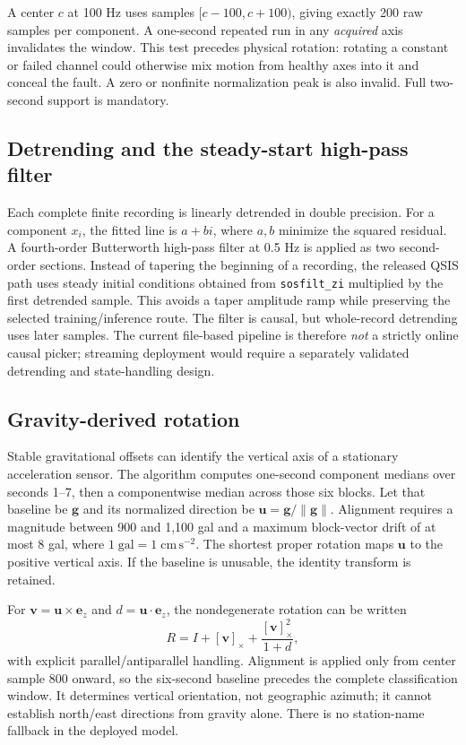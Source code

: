 \documentclass[a4paper,11pt,oneside]{article}
\newcommand{\code}[1]{\nolinkurl{#1}}
\begin{document}
A center $c$ at 100 Hz uses samples $[c-100,c+100)$, giving exactly 200 raw
samples per component. A one-second repeated run in any \emph{acquired} axis
invalidates the window. This test precedes physical rotation: rotating a
constant or failed channel could otherwise mix motion from healthy axes into
it and conceal the fault. A zero or nonfinite normalization peak is also
invalid. Full two-second support is mandatory.

\subsection{Detrending and the steady-start high-pass filter}
Each complete finite recording is linearly detrended in double precision.
For a component $x_i$, the fitted line is $a+bi$, where $a,b$ minimize the
squared residual. A fourth-order Butterworth high-pass filter at 0.5 Hz is
applied as two second-order sections. Instead of tapering the beginning of a
recording, the released QSIS path uses steady initial conditions obtained
from \code{sosfilt_zi} multiplied by the first detrended sample. This avoids a
taper amplitude ramp while preserving the selected training/inference route.
The filter is causal, but whole-record detrending uses later samples. The
current file-based pipeline is therefore \emph{not} a strictly online causal
picker; streaming deployment would require a separately validated detrending
and state-handling design.

\subsection{Gravity-derived rotation}
Stable gravitational offsets can identify the vertical axis of a stationary
acceleration sensor. The algorithm computes one-second component medians over
seconds 1--7, then a componentwise median across those six blocks. Let that
baseline be $\mathbf{g}$ and its normalized direction be
$\mathbf{u}=\mathbf{g}/\|\mathbf{g}\|$. Alignment requires a magnitude between
900 and 1,100 gal and a maximum block-vector drift of at most 8 gal, where
$1\;\mathrm{gal}=1\;\mathrm{cm\,s^{-2}}$. The shortest proper rotation maps
$\mathbf{u}$ to the positive vertical axis. If the baseline is unusable, the
identity transform is retained.

For $\mathbf{v}=\mathbf{u}\times\mathbf{e}_z$ and
$d=\mathbf{u}\cdot\mathbf{e}_z$, the nondegenerate rotation can be written
\begin{equation}
 R=I+[\mathbf{v}]_\times+
 \frac{[\mathbf{v}]_\times^2}{1+d},
\end{equation}
with explicit parallel/antiparallel handling. Alignment is applied only from
center sample 800 onward, so the six-second baseline precedes the complete
classification window. It determines vertical orientation, not geographic
azimuth; it cannot establish north/east directions from gravity alone. There
is no station-name fallback in the deployed model.
\end{document}

